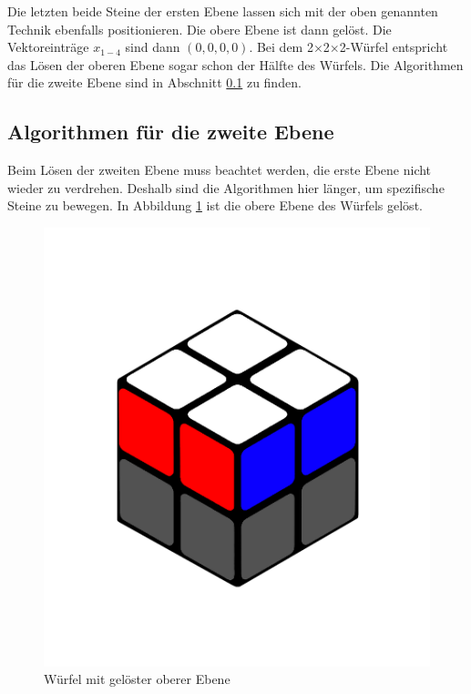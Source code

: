\documentclass[12pt,a4paper, usenames, dvipsnames]{article}
\theoremstyle{mystyle}
\theoremstyle{definition}
\newcommand{\Ttwo}{2$\times$2$\times$2-}
\begin{document}
Die letzten beide Steine der ersten Ebene lassen sich mit der oben genannten Technik ebenfalls positionieren. Die obere Ebene ist dann gelöst. Die Vektoreinträge $x_{1-4}$ sind dann $(0,0,0,0)$.
Bei dem \Ttwo Würfel entspricht das Lösen der oberen Ebene sogar schon der Hälfte des Würfels. Die Algorithmen für die zweite Ebene sind in Abschnitt \ref{Abschnitt_AlgorithmenZweiteEbene} zu finden.



%
%
%
%
%
%
%
%
%
%
%
%
%
%
%
%
%
%
%
\subsection{Algorithmen für die zweite Ebene}
\label{Abschnitt_AlgorithmenZweiteEbene}

Beim Lösen der zweiten Ebene muss beachtet werden, die erste Ebene nicht wieder zu verdrehen. Deshalb sind die Algorithmen hier länger, um spezifische Steine zu bewegen.
In Abbildung \ref{Abbildung_GelösteObereEbene} ist die obere Ebene des Würfels gelöst. 

\begin{figure}[H]
\centering
\includegraphics[scale=0.1]{ebene.png}
\caption{Würfel mit gelöster oberer Ebene}
\label{Abbildung_GelösteObereEbene}
\end{figure}
\end{document}
